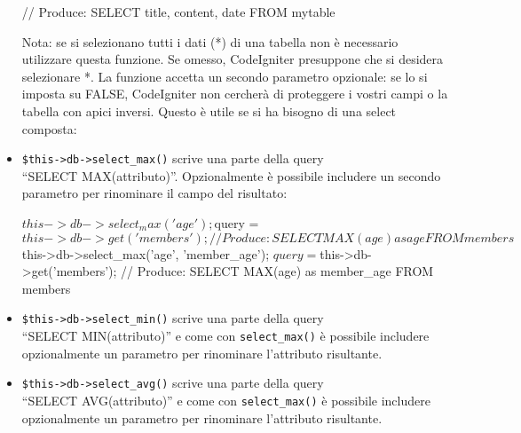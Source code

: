 \begin{itemize}
\begin{code}
// Produce: SELECT title, content, date FROM mytable
\end{code}

Nota: se si selezionano tutti i dati (*) di una tabella non è necessario utilizzare questa funzione. Se omesso, CodeIgniter presuppone che si desidera selezionare *. La funzione accetta un secondo parametro opzionale: se lo si imposta su FALSE, CodeIgniter non cercherà di proteggere i vostri campi o la tabella con apici inversi. Questo è utile se si ha bisogno di una select composta:


\item \verb|$this->db->select_max()| scrive una parte della query \\ ``SELECT MAX(attributo)''. Opzionalmente è possibile includere un secondo parametro per rinominare il campo del risultato:

\begin{code}
$this->db->select_max('age');
$query = $this->db->get('members');
// Produce: SELECT MAX(age) as age FROM members

$this->db->select_max('age', 'member_age');
$query = $this->db->get('members');
// Produce: SELECT MAX(age) as member_age FROM members
\end{code}

\item \verb|$this->db->select_min()| 
scrive una parte della query \\ ``SELECT MIN(attributo)'' e come con \verb|select_max()| è possibile includere opzionalmente un parametro per rinominare l'attributo risultante.


\item \verb|$this->db->select_avg()| scrive una parte della query \\ ``SELECT AVG(attributo)'' e come con \verb|select_max()| è possibile includere opzionalmente un parametro per rinominare l'attributo risultante.



\end{itemize}
